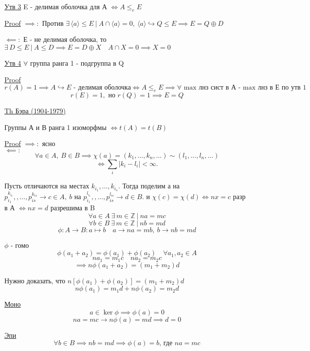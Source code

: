 \documentclass[a4paper]{article}
\begin{document}
\begin{tcolorbox}
    \underline{Утв 3} E - делимая оболочка для А $ \iff A \leq_e E $ 

    \underline{Proof} $ \implies: $ Против $ \exists \, \langle a \rangle \leq E \ | \ 
    A \cap \langle a \rangle = 0, \ \langle a \rangle \hookrightarrow Q \leq E \implies
    E = Q \oplus D$ 

    $ \impliedby: $ Е - не делимая оболочка, то $ \exists \, D \leq E \ | \ 
    A \leq D  \implies E = D \oplus X \quad A \cap X = 0 \implies X = 0$ 
\end{tcolorbox}

\begin{tcolorbox}
    \underline{Утв 4} $ \forall $ группа ранга 1 - подгруппа в Q

    \underline{Proof} 
    \[
        r(A) = 1 \implies A \hookrightarrow E \text{ - делимая оболочка}
        \iff A \leq_e E \implies \forall \text{ max лнз сист в А - max лнз в Е по
        утв 1}
    \]
    \[
        r(E) = 1, \text{ но } r(Q) = 1 \implies E = Q
    \]
\end{tcolorbox}

\begin{tcolorbox}
\underline{Th Бэра (1904-1979)}

Группы А и В ранга 1 изоморфмы $ \iff t(A) = t(B)$ 

\underline{Proof} $ \implies: $ ясно\\
$ \impliedby: $ 
\[
    \forall a \in A , \ B \in B \implies \chi(a) = (k_1, \dots , k_n, \dots)
    \sim (l_1, \dots, l_n, \dots)
\]
\[
    \iff \sum_{i} |k_i - l_i| < \infty.
\]

Пусть отличаются на местах $ k_{i_1}, \dots, k_{i_s} $. Тогда поделим а на $ p_{i_1}^{k_{i_1}},
, \dots, p_{is}^{k_{is}} \to c \in A, \ b \text{ на }p_{i_1}^{l_{i_1}}, , \dots,
p_{is}^{l_{is}} \to d \in B $. и $ \chi(c) = \chi(d) \iff nx = c $ разр в А
$ \iff nx = d $ разрешима в B
\[
    \forall a \in A \ \exists \, m \in \mathbb{Z} \ | \ na = mc
\]
\[
    \forall b \in B \ \exists \, m \in \mathbb{Z} \ | \ nb = md
\]
\[
    \phi: A \to B: a \mapsto b \quad a \to na = mb, \ b \to nb = md
\]

$ \phi $ - гомо
\[
    \phi(a_1 + a_2) = \phi(a_1) + \phi(a_2) \quad \forall a_1, a_2 \in A
\]
\[
    n a_1 = m_1 c \quad n a_2 = m_2 c
\]
\[
    \implies n \phi(a_1 + a_2) = (m_1 + m_2) d
\]

Нужно доказать, что $ n[\phi(a_1) + \phi(a_2)] = (m_1 + m_2) d $ 
\[
    n \phi(a_1) = m_1 d + n \phi(a_2) = m_2 d
\]

\underline{Моно}
\[
    a \in \ker \phi \implies \phi(a) = 0
\]
\[
    na = mc \to n \phi(a) = md \implies d = 0
\]

\underline{Эпи}
\[
    \forall b \in B \implies nb = md \implies \phi(a) = b \text{, где } na = mc
\]
\end{tcolorbox}
\end{document}
